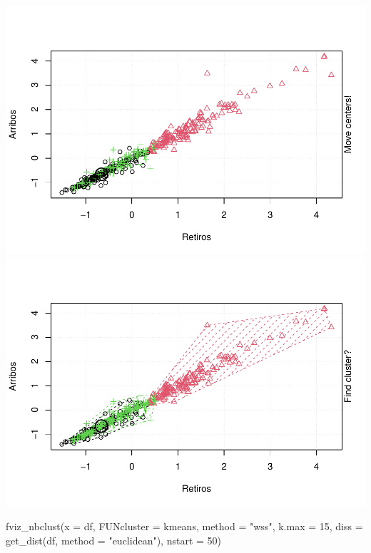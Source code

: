 \documentclass[
]{article}
\newenvironment{Shaded}{\begin{snugshade}}{\end{snugshade}}
\newcommand{\AttributeTok}[1]{\textcolor[rgb]{0.77,0.63,0.00}{#1}}
\newcommand{\DecValTok}[1]{\textcolor[rgb]{0.00,0.00,0.81}{#1}}
\newcommand{\FunctionTok}[1]{\textcolor[rgb]{0.00,0.00,0.00}{#1}}
\newcommand{\NormalTok}[1]{#1}
\newcommand{\StringTok}[1]{\textcolor[rgb]{0.31,0.60,0.02}{#1}}
\begin{document}
\includegraphics{Ecobici_files/figure-latex/unnamed-chunk-12-19.pdf}
\includegraphics{Ecobici_files/figure-latex/unnamed-chunk-12-20.pdf}

\begin{Shaded}
\begin{Highlighting}[]
\FunctionTok{fviz\_nbclust}\NormalTok{(}\AttributeTok{x =}\NormalTok{ df, }\AttributeTok{FUNcluster =}\NormalTok{ kmeans, }\AttributeTok{method =} \StringTok{"wss"}\NormalTok{, }\AttributeTok{k.max =} \DecValTok{15}\NormalTok{, }
             \AttributeTok{diss =} \FunctionTok{get\_dist}\NormalTok{(df, }\AttributeTok{method =} \StringTok{"euclidean"}\NormalTok{), }\AttributeTok{nstart =} \DecValTok{50}\NormalTok{)}
\end{Highlighting}
\end{Shaded}
\end{document}
